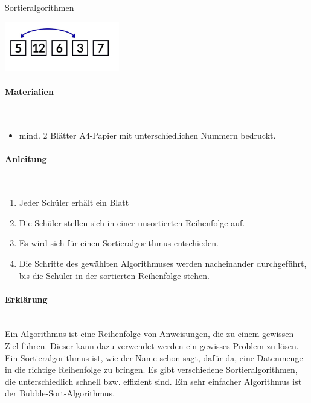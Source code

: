 \documentclass[a4paper, 12pt]{report}
\begin{document}
	\thispagestyle{empty}
	
	{
		\centering
		\Huge
		\color{blue}
		Sortieralgorithmen
	}
	
	\centering
	\includegraphics[width=5cm]{IMG_1125.JPG}
	\raggedright
	\paragraph{\color{blue}Materialien} \mbox{} \\
	\begin{itemize}
		\item mind. 2 Blätter A4-Papier mit unterschiedlichen Nummern bedruckt.
	\end{itemize}
	
	\raggedright
	\paragraph{\color{blue}Anleitung} \mbox{} \\
	\begin{enumerate}
		\item Jeder Schüler erhält ein Blatt
		\item Die Schüler stellen sich in einer unsortierten Reihenfolge auf.
		\item Es wird sich für einen Sortieralgorithmus entschieden.
		\item Die Schritte des gewählten Algorithmuses werden nacheinander durchgeführt, bis die Schüler in der sortierten Reihenfolge stehen.
	\end{enumerate}
	
	\raggedright
	\paragraph{\color{blue}Erklärung} \mbox{} \\
	
	Ein Algorithmus ist eine Reihenfolge von Anweisungen, die zu einem gewissen Ziel führen.
	Dieser kann dazu verwendet werden ein gewisses Problem zu lösen.
	Ein Sortieralgorithmus ist, wie der Name schon sagt, dafür da, eine Datenmenge in die richtige Reihenfolge zu bringen.
	Es gibt verschiedene Sortieralgorithmen, die unterschiedlich schnell bzw. effizient sind. Ein sehr einfacher Algorithmus ist der Bubble-Sort-Algorithmus. 	\newpage
	
\end{document}
